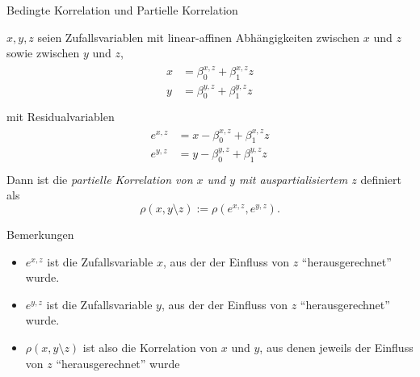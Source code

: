 \documentclass[
  8pt,
  ignorenonframetext,
]{beamer}
\providecommand{\tightlist}{%
  \setlength{\itemsep}{0pt}\setlength{\parskip}{0pt}}
\begin{document}
\begin{frame}{Bedingte Korrelation und Partielle Korrelation}
\protect\hypertarget{bedingte-korrelation-und-partielle-korrelation-6}{}
\footnotesize
\begin{definition}
$x,y,z$ seien Zufallsvariablen mit linear-affinen Abhängigkeiten zwischen
$x$ und $z$ sowie zwischen $y$ und $z$,
\begin{align}
\begin{split}
x & = \beta_0^{x,z}    + \beta_1^{x,z}z \\
y & = \beta_0^{y,z}  + \beta_1^{y  ,z}z \\
\end{split}
\end{align}
mit Residualvariablen
\begin{align}
\begin{split}
e^{x,z} & = x - \beta_0^{x,z}  + \beta_1^{x,z}z \\
e^{y,z} & = y - \beta_0^{y,z}  + \beta_1^{y  ,z}z \\
\end{split}
\end{align}
Dann ist die \textit{partielle Korrelation von $x$ und $y$ mit auspartialisiertem $z$} definiert als
\begin{equation}
\rho(x,y \setminus z) := \rho(e^{x,z},e^{y,z}).
\end{equation}
\end{definition}

Bemerkungen

\begin{itemize}
\tightlist
\item
  \(e^{x,z}\) ist die Zufallsvariable \(x\), aus der der Einfluss von
  \(z\) ``herausgerechnet'' wurde.
\item
  \(e^{y,z}\) ist die Zufallsvariable \(y\), aus der der Einfluss von
  \(z\) ``herausgerechnet'' wurde.
\item
  \(\rho(x,y \setminus z)\) ist also die Korrelation von \(x\) und
  \(y\), aus denen jeweils der Einfluss von \(z\) ``herausgerechnet''
  wurde
\end{itemize}
\end{frame}
\end{document}

